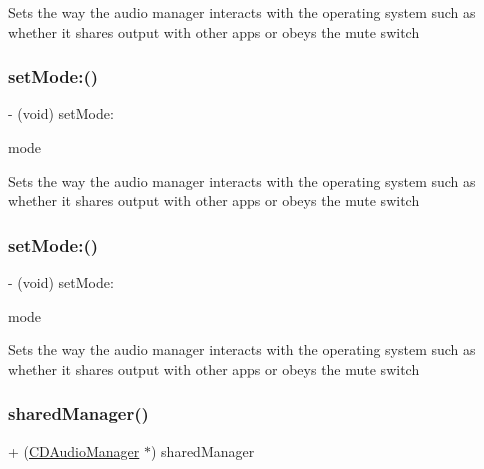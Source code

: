 Sets the way the audio manager interacts with the operating system such as whether it shares output with other apps or obeys the mute switch \mbox{\label{interfaceCDAudioManager_a72fd182d62cc75dfa3701da4a5d97346}} 
\subsubsection{\texorpdfstring{set\+Mode\+:()}{setMode:()}\hspace{0.1cm}{\footnotesize\ttfamily [3/4]}}
{\footnotesize\ttfamily -\/ (void) set\+Mode\+: \begin{DoxyParamCaption}\item[{(t\+Audio\+Manager\+Mode)}]{mode }\end{DoxyParamCaption}}

Sets the way the audio manager interacts with the operating system such as whether it shares output with other apps or obeys the mute switch \mbox{\label{interfaceCDAudioManager_a72fd182d62cc75dfa3701da4a5d97346}} 
\subsubsection{\texorpdfstring{set\+Mode\+:()}{setMode:()}\hspace{0.1cm}{\footnotesize\ttfamily [4/4]}}
{\footnotesize\ttfamily -\/ (void) set\+Mode\+: \begin{DoxyParamCaption}\item[{(t\+Audio\+Manager\+Mode)}]{mode }\end{DoxyParamCaption}}

Sets the way the audio manager interacts with the operating system such as whether it shares output with other apps or obeys the mute switch \mbox{\label{interfaceCDAudioManager_a757b69bd4a902166b3ffa81ea85ba6e8}} 
\subsubsection{\texorpdfstring{shared\+Manager()}{sharedManager()}\hspace{0.1cm}{\footnotesize\ttfamily [1/4]}}
{\footnotesize\ttfamily + (\hyperlink{interfaceCDAudioManager}{C\+D\+Audio\+Manager} $\ast$) shared\+Manager \begin{DoxyParamCaption}{ }\end{DoxyParamCaption}}

